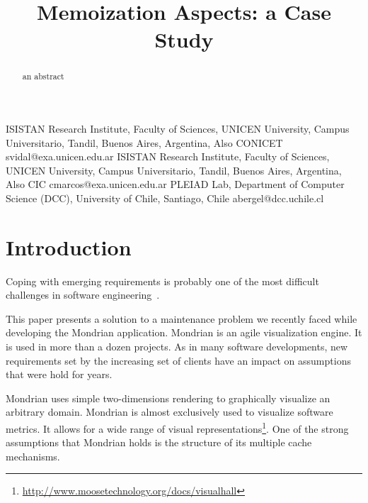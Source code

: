 \documentclass[preprint,10pt]{sigplanconf}
\newcommand{\seclabel}[1]{\label{sec:#1}}
\begin{document}

\title{Memoization Aspects: a Case Study}

	{ISISTAN Research Institute, Faculty of Sciences, UNICEN University, Campus Universitario, Tandil, Buenos Aires, Argentina, Also CONICET}
	{svidal@exa.unicen.edu.ar}
	{ISISTAN Research Institute, Faculty of Sciences, UNICEN University, Campus Universitario, Tandil, Buenos Aires, Argentina, Also CIC}
	{cmarcos@exa.unicen.edu.ar}
	{PLEIAD Lab, Department of Computer Science (DCC), University of Chile, Santiago, Chile}
	{abergel@dcc.uchile.cl}


\maketitle


\begin{abstract}
an abstract
\end{abstract}

\section{Introduction}\seclabel{introduction}

Coping with emerging requirements is probably one of the most difficult challenges in software engineering~\cite{Somm00a}. 

This paper presents a solution to a maintenance problem we recently faced while developing the Mondrian application.
Mondrian is an agile visualization engine. It is used in more than a dozen projects. As in many software developments, new requirements set by the increasing set of clients have an impact on assumptions that were hold for years. 

Mondrian uses simple two-dimensions rendering to graphically visualize an arbitrary domain. Mondrian is almost exclusively used to visualize software metrics. It allows for a wide range of visual representations\footnote{\url{http://www.moosetechnology.org/docs/visualhall}}.
One of the strong assumptions that Mondrian holds is the structure of its multiple cache mechanisms. 
\end{document}
